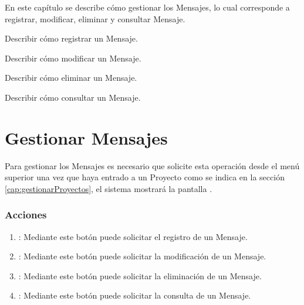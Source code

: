 
En este capítulo se describe cómo gestionar los Mensajes, lo cual corresponde a registrar, modificar, eliminar y
consultar Mensaje.\\


\begin{objetivos}
	\item Describir cómo registrar un Mensaje.
	\item Describir cómo modificar un Mensaje.
	\item Describir cómo eliminar un Mensaje.
	\item Describir cómo consultar un Mensaje.
\end{objetivos}

\section{Gestionar Mensajes}

Para gestionar los Mensajes es necesario que solicite esta operación desde el menú superior una vez que haya entrado a un Proyecto como se indica en la sección \ref{cap:gestionarProyectos}, el sistema mostrará la pantalla .


\subsubsection{Acciones}

\begin{enumerate}
	\item {}: Mediante este botón puede solicitar el registro de un Mensaje.
	\item {}: Mediante este botón puede solicitar la modificación de un Mensaje.
	\item {}: Mediante este botón puede solicitar la eliminación de un Mensaje.
	\item {}: Mediante este botón puede solicitar la consulta de un Mensaje.
\end{enumerate}






